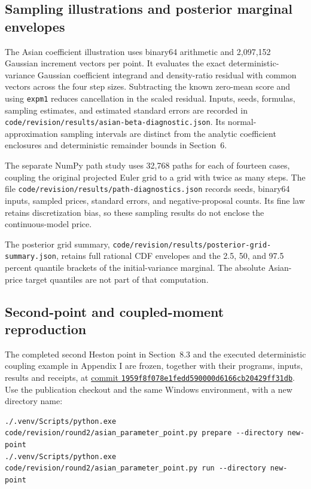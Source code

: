 \subsection{Sampling illustrations and posterior marginal envelopes}


The Asian coefficient illustration uses binary64 arithmetic and 2,097,152
Gaussian increment vectors per point. It evaluates the exact
deterministic-variance Gaussian coefficient integrand and density-ratio residual
with common vectors across the four step sizes. Subtracting the known zero-mean
score and using \texttt{expm1} reduces cancellation in the scaled residual.
Inputs, seeds, formulas, sampling estimates, and estimated standard errors
are recorded in \texttt{code/revision/results/asian-beta-diagnostic.json}.
Its normal-approximation sampling intervals are distinct from the analytic
coefficient enclosures and deterministic remainder bounds in Section~6.

The separate NumPy path study uses 32,768 paths for each of fourteen cases,
coupling the original projected Euler grid to a grid with twice as many steps.
The file \texttt{code/revision/results/path-diagnostics.json} records seeds,
binary64 inputs, sampled prices, standard errors, and negative-proposal counts.
Its fine law retains discretization bias, so these sampling results do not
enclose the continuous-model price.

The posterior grid summary,
\texttt{code/revision/results/posterior-grid-summary.json}, retains full rational
CDF envelopes and the 2.5, 50, and 97.5 percent quantile brackets of the
initial-variance marginal. The absolute Asian-price target quantiles are
not part of that computation.


\subsection{Second-point and coupled-moment reproduction}

The completed second Heston point in Section~8.3 and the executed deterministic
coupling example in Appendix I are frozen, together with their programs,
inputs, results and receipts, at
\href{https://github.com/130U/certified-valuation-arithmetic-asian-options/tree/1959f8f078e1fedd590000d6166cb20429ff31db}{commit \texttt{1959f8f078e1fedd590000d6166cb20429ff31db}}.
Use the publication checkout and the same Windows environment, with a new directory name:

\begin{verbatim}
./.venv/Scripts/python.exe code/revision/round2/asian_parameter_point.py prepare --directory new-point
./.venv/Scripts/python.exe code/revision/round2/asian_parameter_point.py run --directory new-point
\end{verbatim}

